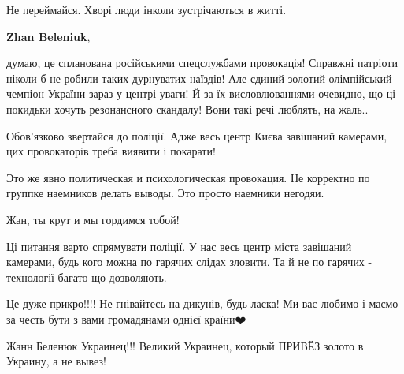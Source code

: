 \begin{itemize}
Не переймайся. Хворі люди інколи зустрічаються в житті.

 
\textbf{Zhan Beleniuk}, 

думаю, це спланована російськими спецслужбами провокація! Справжні патріоти
ніколи б не робили таких дурнуватих наїздів! Але єдиний золотий олімпійський
чемпіон України зараз у центрі уваги! Й за їх висловлюваннями очевидно, що ці
покидьки хочуть резонансного скандалу! Вони такі речі люблять, на жаль..

Обов'язково звертайся до поліції. Адже весь центр Києва завішаний камерами, цих
провокаторів треба виявити і покарати!

 
Это же явно политическая и психологическая провокация. Не корректно по группке
наемников делать выводы. Это просто наемники негодяи.

 
Жан, ты крут и мы гордимся тобой!


Ці питання варто спрямувати поліції. У нас весь центр міста завішаний камерами,
будь кого можна по гарячих слідах зловити. Та й не по гарячих - технології
багато що дозволяють.


Це дуже прикро!!!! Не гнівайтесь на дикунів, будь ласка! Ми вас любимо і маємо
за честь бути з вами громадянами однієї країни❤️

 
Жанн Беленюк Украинец!!! Великий Украинец, который ПРИВЁЗ золото в Украину, а не вывез!

 


\end{itemize}
